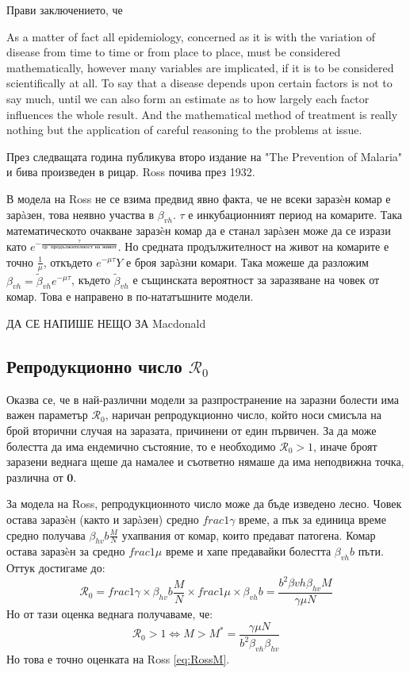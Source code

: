 Прави заключението, че
\begin{displayquote}
  As a matter of fact all epidemiology, concerned as it is with the variation of disease from
  time to time or from place to place, must be considered mathematically, however many
  variables are implicated, if it is to be considered scientifically at all. To say that a disease
  depends upon certain factors is not to say much, until we can also form an estimate as to how
  largely each factor influences the whole result. And the mathematical method of treatment
  is really nothing but the application of careful reasoning to the problems at issue.
\end{displayquote}
През следващата година публикува второ издание на "The Prevention of Malaria" и бива произведен в рицар. Ross почива през 1932.

В модела на Ross не се взима предвид явно факта, че не всеки заразèн комар е зарàзен, това неявно участва в $\beta_{vh}$.
$\tau$ е инкубационният период на комарите. Така математическото очакване заразèн комар да е станал зарàзен може да се изрази като $e^{-\frac{\tau}{\text{ср. продължителност на живот}}}$. Но средната продължителност на живот на комарите е точно $\frac{1}{\mu}$, откъдето $e^{-\mu\tau}Y$ е броя зарàзни комари.
Така можеше да разложим $\beta_{vh} = \tilde{\beta}_{vh} e^{-\mu\tau}$, където $\tilde{\beta}_{vh}$ е същинската вероятност за заразяване на човек от комар. Това е направено в по-нататъшните модели.

\color{Red} ДА СЕ НАПИШЕ НЕЩО ЗА Macdonald
\color{Black}

\subsection{Репродукционно число $\mathscr{R}_0$}
Оказва се, че в най-различни модели за разпространение на заразни болести има важен параметър $\mathscr{R}_0$, наричан репродукционно число, който носи смисъла на брой вторични случая на заразата, причинени от един първичен. За да може болестта да има ендемично състояние, то е необходимо $\mathscr{R}_0 > 1$, иначе броят заразени веднага щеше да намалее и съответно нямаше да има неподвижна точка, различна от $\mathbf{0}$.

За модела на Ross, репродукционното число може да бъде изведено лесно.
Човек остава заразèн (както и зарàзен) средно $frac{1}{\gamma}$ време, а пък за единица време средно получава $\beta_{hv} b \frac{M}{N}$ ухапвания от комар, които предават патогена.
Комар остава заразèн за средно $frac{1}{\mu}$ време и хапе предавайки болестта $\beta_{vh} b$ пъти.
Оттук достигаме до:
\begin{equation}
  \mathscr{R}_0 = frac{1}{\gamma} \times \beta_{hv} b \frac{M}{N} \times frac{1}{\mu} \times \beta_{vh} b = \frac{b^2 \beta{vh} \beta_{hv} M}{ \gamma \mu N}
\end{equation}
Но от тази оценка веднага получаваме, че:
\begin{equation}
  \mathscr{R}_0 > 1 \iff M > M^* = \frac{\gamma \mu N}{b^2 \beta_{vh} \beta_{hv}}
\end{equation}
Но това е точно оценката на Ross \ref{eq:RossM}.


